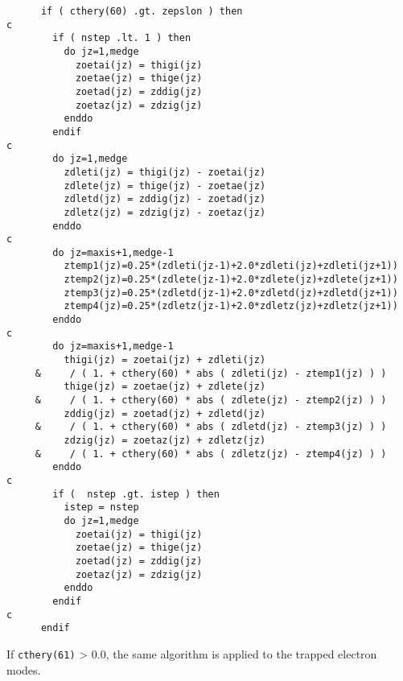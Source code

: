 \begin{verbatim}
      if ( cthery(60) .gt. zepslon ) then
c
        if ( nstep .lt. 1 ) then
          do jz=1,medge
            zoetai(jz) = thigi(jz)
            zoetae(jz) = thige(jz)
            zoetad(jz) = zddig(jz)
            zoetaz(jz) = zdzig(jz)
          enddo
        endif
c
        do jz=1,medge
          zdleti(jz) = thigi(jz) - zoetai(jz)
          zdlete(jz) = thige(jz) - zoetae(jz)
          zdletd(jz) = zddig(jz) - zoetad(jz)
          zdletz(jz) = zdzig(jz) - zoetaz(jz)
        enddo
c
        do jz=maxis+1,medge-1
          ztemp1(jz)=0.25*(zdleti(jz-1)+2.0*zdleti(jz)+zdleti(jz+1))
          ztemp2(jz)=0.25*(zdlete(jz-1)+2.0*zdlete(jz)+zdlete(jz+1))
          ztemp3(jz)=0.25*(zdletd(jz-1)+2.0*zdletd(jz)+zdletd(jz+1))
          ztemp4(jz)=0.25*(zdletz(jz-1)+2.0*zdletz(jz)+zdletz(jz+1))
        enddo
c
        do jz=maxis+1,medge-1
          thigi(jz) = zoetai(jz) + zdleti(jz)
     &     / ( 1. + cthery(60) * abs ( zdleti(jz) - ztemp1(jz) ) )
          thige(jz) = zoetae(jz) + zdlete(jz)
     &     / ( 1. + cthery(60) * abs ( zdlete(jz) - ztemp2(jz) ) )
          zddig(jz) = zoetad(jz) + zdletd(jz)
     &     / ( 1. + cthery(60) * abs ( zdletd(jz) - ztemp3(jz) ) )
          zdzig(jz) = zoetaz(jz) + zdletz(jz)
     &     / ( 1. + cthery(60) * abs ( zdletz(jz) - ztemp4(jz) ) )
        enddo
c
        if (  nstep .gt. istep ) then
          istep = nstep
          do jz=1,medge
            zoetai(jz) = thigi(jz)
            zoetae(jz) = thige(jz)
            zoetad(jz) = zddig(jz)
            zoetaz(jz) = zdzig(jz)
          enddo
        endif
c
      endif
\end{verbatim}

If {\tt cthery(61)} > 0.0, the same algorithm is applied to the 
trapped electron modes.

